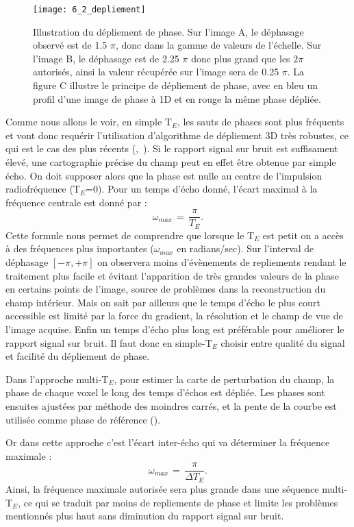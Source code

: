 {%
\begin{figure}[!t]
\centering
\texttt{[image: 6\_2\_depliement]}
\caption{Illustration du dépliement de phase. Sur l’image A, le déphasage observé est de 1.5 $\pi$, donc dans la gamme de valeurs
de l’échelle. Sur l’image B, le déphasage est de 2.25 $\pi$ donc plus grand que les $2\pi$ autorisés, ainsi la valeur récupérée sur
l’image sera de 0.25 $\pi$. La figure C illustre le principe de dépliement de phase, avec en bleu un profil d’une image de phase à
1D et en rouge la même phase dépliée.
}
\label{fig:6_2_depliement}	
\end{figure}
Comme nous allons le voir, en simple T$_E$, les sauts de phases sont plus fréquents et vont donc
requérir l’utilisation d’algorithme de dépliement 3D très robustes, ce qui est le cas des plus récents
(\cite{Schofield2003},~\cite{Witoszynskyj2009}). Si le rapport signal sur bruit est suffisament élevé, une cartographie précise du champ peut
en effet être obtenue par simple écho. On doit supposer alors que la phase est nulle au centre de
l’impulsion radiofréquence (T$_E$=0). Pour un temps d’écho donné, l’écart maximal à la fréquence
centrale est donné par :
\begin{equation}
\omega_{max}\,=\,\frac{\pi}{T_E}.
\end{equation}
Cette formule nous permet de comprendre que lorsque le T$_E$ est petit on a accès à des
fréquences plus importantes ($\omega_{max}$ en radians/sec). Sur l’interval de déphasage $[-\pi,+\pi]$ on observera
moins d’évènements de repliements rendant le traitement plus facile et évitant l’apparition de très
grandes valeurs de la phase en certains points de l’image, source de problèmes dans la reconstruction
du champ intérieur. Mais on sait par ailleurs que le temps d’écho le plus court accessible est limité par
la force du gradient, la résolution et le champ de vue de l’image acquise. Enfin un temps d’écho plus
long est préférable pour améliorer le rapport signal sur bruit. Il faut donc en simple-T$_E$ choisir entre
qualité du signal et facilité du dépliement de phase.

Dans l’approche multi-T$_E$, pour estimer la carte de perturbation du champ, la phase de chaque
voxel le long des temps d’échos est dépliée. Les phases sont ensuites ajustées par méthode des
moindres carrés, et la pente de la courbe est utilisée comme phase de référence (\cite{Kressler2010}). 

Or dans cette approche c’est l’écart inter-écho qui va déterminer la fréquence maximale :
\begin{equation}
\omega_{max}\,=\,\frac{\pi}{\Delta T_E}.
\end{equation}
Ainsi, la fréquence maximale autorisée sera plus grande dans une séquence multi-T$_E$, ce qui se traduit
par moins de repliements de phase et limite les problèmes mentionnés plus haut sans diminution du
rapport signal sur bruit.

}
